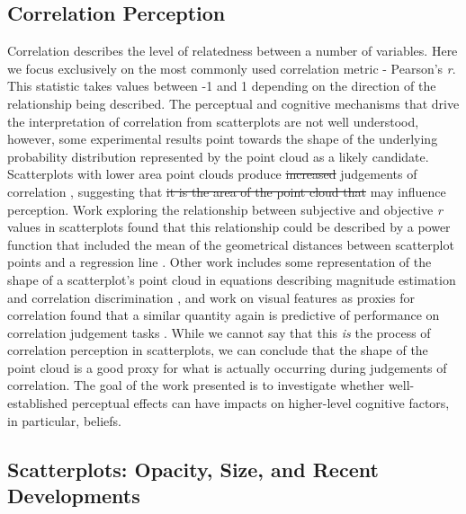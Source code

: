 \documentclass[manuscript,screen,review,anonymous]{acmart}
\providecommand{\DIFaddtex}[1]{{\protect\color{blue}\uwave{#1}}} %
\providecommand{\DIFdeltex}[1]{{\protect\color{red}\sout{#1}}} %
\providecommand{\DIFaddbegin}{} %
\providecommand{\DIFaddend}{} %
\providecommand{\DIFdelbegin}{} %
\providecommand{\DIFdelend}{} %
\providecommand{\DIFadd}[1]{\texorpdfstring{\DIFaddtex{#1}}{#1}} %
\providecommand{\DIFdel}[1]{\texorpdfstring{\DIFdeltex{#1}}{}} %
\newcommand{\DIFscaledelfig}{0.5}
\newlength{\DIFdelgraphicswidth} %
\newlength{\DIFdelgraphicsheight} %
\newcommand{\DIFaddincludegraphics}[2][]{{\color{blue}\fbox{\DIFOincludegraphics[#1]{#2}}}} %
\newcommand{\DIFdelincludegraphics}[2][]{%
\sbox{\DIFdelgraphicsbox}{\DIFOincludegraphics[#1]{#2}}%
\settoboxwidth{\DIFdelgraphicswidth}{\DIFdelgraphicsbox} %
\settoboxtotalheight{\DIFdelgraphicsheight}{\DIFdelgraphicsbox} %
\scalebox{\DIFscaledelfig}{%
\parbox[b]{\DIFdelgraphicswidth}{\usebox{\DIFdelgraphicsbox}\\[-\baselineskip] \rule{\DIFdelgraphicswidth}{0em}}\llap{\resizebox{\DIFdelgraphicswidth}{\DIFdelgraphicsheight}{%
\setlength{\unitlength}{\DIFdelgraphicswidth}%
\begin{picture}(1,1)%
\thicklines\linethickness{2pt} %
{\color[rgb]{1,0,0}\put(0,0){\framebox(1,1){}}}%
{\color[rgb]{1,0,0}\put(0,0){\line( 1,1){1}}}%
{\color[rgb]{1,0,0}\put(0,1){\line(1,-1){1}}}%
\end{picture}%
}\hspace*{3pt}}} %
} %
\DeclareRobustCommand{\DIFaddbegin}{\DIFOaddbegin \let\includegraphics\DIFaddincludegraphics} %
\DeclareRobustCommand{\DIFaddend}{\DIFOaddend \let\includegraphics\DIFOincludegraphics} %
\DeclareRobustCommand{\DIFdelbegin}{\DIFOdelbegin \let\includegraphics\DIFdelincludegraphics} %
\DeclareRobustCommand{\DIFdelend}{\DIFOaddend \let\includegraphics\DIFOincludegraphics} %
\begin{document}
\subsection{Correlation Perception}\label{sec-corr-percept}

Correlation describes the level of relatedness between a number of
variables. Here we focus exclusively on the most commonly used
correlation metric - Pearson's \emph{r}. This statistic takes values
between -1 and 1 depending on the direction of the relationship being
described. The perceptual and cognitive mechanisms that drive the
interpretation of correlation from scatterplots are not well understood,
however, some experimental results point towards the shape of the
underlying probability distribution represented by the point cloud as a
likely candidate. Scatterplots with lower area point clouds produce
\DIFdelbegin \DIFdel{increased }\DIFdelend \DIFaddbegin \DIFadd{greater }\DIFaddend judgements of correlation \citep{cleveland_1982}, suggesting
that \DIFdelbegin \DIFdel{it is the area of the point cloud that }\DIFdelend \DIFaddbegin \DIFadd{point cloud area }\DIFaddend may influence perception. Work exploring the
relationship between subjective and objective \emph{r} values in
scatterplots found that this relationship could be described by a power
function that included the mean of the geometrical distances between
scatterplot points and a regression line \citep{meyer_1997}. Other work
includes some representation of the shape of a scatterplot's point cloud
in equations describing magnitude estimation and correlation
discrimination \citep{meyer_1997, rensink_2017}, and work on visual
features as proxies for correlation found that a similar quantity again
is predictive of performance on correlation judgement tasks
\citep{yang_2019}. While we cannot say that this \emph{is} the process
of correlation perception in scatterplots, we can conclude that the
shape of the point cloud is a good proxy for what is actually occurring
during judgements of correlation. The goal of the work presented is to
investigate whether well-established perceptual effects can have impacts
on higher-level cognitive factors, in particular, beliefs.

\subsection{Scatterplots: Opacity, Size, and Recent
Developments}\label{sec-scatterplots}
\end{document}
